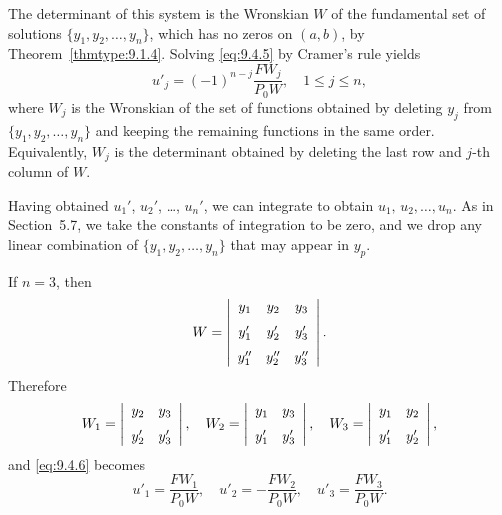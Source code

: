 The determinant of this system is the Wronskian $W$ of the fundamental set of solutions
$\{y_{1},y_{2},\dots,y_{n}\}$, which has no zeros on $(a,b)$, by Theorem~\ref{thmtype:9.1.4}.
Solving \eqref{eq:9.4.5} by Cramer's rule yields
\begin{equation}
  \label{eq:9.4.6}u'_{j}=(-1)^{n-j}\frac{FW_{j}}{P_{0}W},\quad1\le j\le n,
\end{equation}
where $W_{j}$ is the Wronskian of the set of functions obtained by deleting $y_{j}$ from
$\{y_{1},y_{2},\dots,y_{n}\}$ and keeping the remaining functions in the same order. Equivalently,
$W_{j}$ is the determinant obtained by deleting the last row and $j$-th column of $W$.

Having obtained $u_{1}'$, $u_{2}'$, \dots, $u_{n}'$, we can integrate to obtain
$u_{1},\,u_{2},\dots,u_{n}$. As in Section~5.7, we take the constants of integration to be zero, and
we drop any linear combination of $\{y_{1},y_{2},\dots,y_{n}\}$ that may appear in $y_{p}$.

\medskip

\color{blue}
\color{black}


\noindent
If $n=3$, then
\[
  W=\left|
  \begin{array}{ccc}
    y_{1}   & y_{2}   & y_{3}   \\[2\jot]
    y'_{1}  & y'_{2}  & y'_{3}  \\[2\jot]
    y''_{1} & y''_{2} & y''_{3}
  \end{array}\right|.
\]
Therefore
\[
  W_{1}=\left|
  \begin{array}{cc}
    y_{2}  & y_{3}  \\[2\jot]
    y'_{2} & y'_{3}
  \end{array}\right|, \quad W_{2}=\left|
  \begin{array}{cc}
    y_{1}  & y_{3}  \\[2\jot]
    y'_{1} & y'_{3}
  \end{array}\right|, \quad W_{3}=\left|
  \begin{array}{cc}
    y_{1}  & y_{2}  \\[2\jot]
    y'_{1} & y'_{2}
  \end{array}\right|,
\]
and \eqref{eq:9.4.6} becomes
\begin{equation}
  \label{eq:9.4.7}u'_{1}=\frac{FW_{1}}{P_{0}W},\quad u'_{2}=-\frac{FW_{2}}{P_{0}W},\quad u'_{3}=\frac{FW_{3}}{P_{0}W}.
\end{equation}

